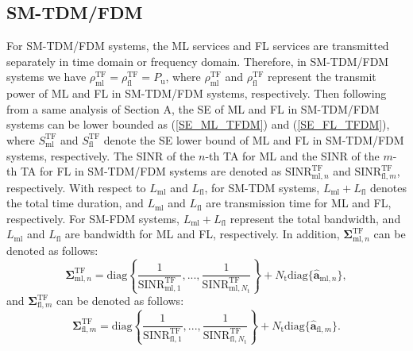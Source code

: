 \documentclass[journal]{IEEEtran}
\begin{document}
\subsection{SM-TDM/FDM}
For SM-TDM/FDM systems, the ML services and FL services are transmitted separately in time domain or frequency domain. Therefore, in SM-TDM/FDM systems we have $\rho_\text{ml}^\text{TF} = \rho_\text{fl}^\text{TF} = P_\text{u}$, where $\rho_\text{ml}^\text{TF}$ and $\rho_\text{fl}^\text{TF}$ represent the transmit power of ML and FL in SM-TDM/FDM systems, respectively. Then following from a same analysis of Section \uppercase\expandafter{} A, the SE of ML and FL in SM-TDM/FDM systems can be lower bounded as (\ref{SE_ML_TFDM}) and (\ref{SE_FL_TFDM}), where $S^\text{TF}_\text{ml}$ and $S^\text{TF}_\text{fl}$ denote the SE lower bound of ML and FL in SM-TDM/FDM systems, respectively. The SINR of the $n$-th TA for ML and the SINR of the $m$-th TA for FL in SM-TDM/FDM systems are denoted as $\text{SINR}^\text{TF}_{\text{ml},n}$ and $\text{SINR}^\text{TF}_{\text{fl},m}$, respectively. With respect to $L_\text{ml}$ and $L_\text{fl}$, for SM-TDM systems, $L_\text{ml} + L_\text{fl}$ denotes the total time duration, and $L_\text{ml}$ and $L_\text{fl}$ are transmission time for ML and FL, respectively. For SM-FDM systems, $L_\text{ml} + L_\text{fl}$ represent the total bandwidth, and $L_\text{ml}$ and $L_\text{fl}$ are bandwidth for ML and FL, respectively. In addition, $\mathbf{\Sigma}^\text{TF}_{\text{ml},n}$ can be denoted as follows:
\begin{equation}
\mathbf{\Sigma}^\text{TF}_{\text{ml},n} = \text{diag}\left\{\frac{1}{\text{SINR}^\text{TF}_{\text{ml},1}}, ..., \frac{1}{\text{SINR}^\text{TF}_{\text{ml},N_\text{t}}}\right\} + N_\text{t} \text{diag}\{\hat{\mathbf{a}}_{\text{ml},n}\},
\label{Sigma_TF_ML}
\end{equation}
and $\mathbf{\Sigma}^\text{TF}_{\text{fl},m}$ can be denoted as follows:
\begin{equation}
\mathbf{\Sigma}^\text{TF}_{\text{fl},m} = \text{diag}\left\{\frac{1}{\text{SINR}^\text{TF}_{\text{fl},1}}, ..., \frac{1}{\text{SINR}^\text{TF}_{\text{fl},N_\text{t}}}\right\} + N_\text{t} \text{diag}\{\hat{\mathbf{a}}_{\text{fl},m}\}.
\label{Sigma_TF_FL}
\end{equation}
\end{document}
